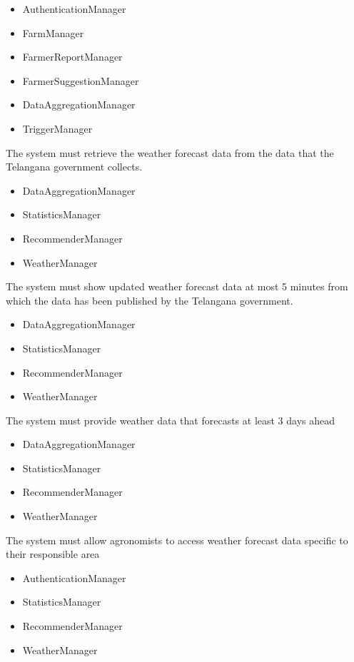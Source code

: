 \begin{itemize}
\begin{itemize}
\item AuthenticationManager
\item FarmManager
\item FarmerReportManager
\item FarmerSuggestionManager
\item DataAggregationManager
\item TriggerManager

\end{itemize}
 The system must retrieve the weather forecast data from the data that the Telangana government collects.
\begin{itemize}


\item DataAggregationManager
\item StatisticsManager
\item RecommenderManager
\item WeatherManager

\end{itemize}
 The system must show updated weather forecast data at most 5 minutes from which the data has been published by the Telangana government.
\begin{itemize}


\item DataAggregationManager
\item StatisticsManager
\item RecommenderManager
\item WeatherManager

\end{itemize}
 The system must provide weather data that forecasts at least 3 days ahead
\begin{itemize}

\item DataAggregationManager
\item StatisticsManager
\item RecommenderManager
\item WeatherManager

\end{itemize}
 The system must allow agronomists to access weather forecast data specific to their responsible area
\begin{itemize}


\item AuthenticationManager
\item StatisticsManager
\item RecommenderManager
\item WeatherManager


\end{itemize}
\end{itemize}
